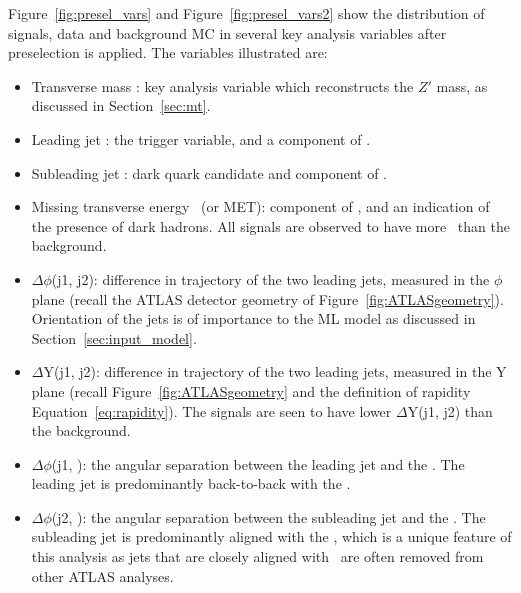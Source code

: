 Figure~\ref{fig:presel_vars} and Figure~\ref{fig:presel_vars2} show the distribution of signals, data and background MC in several key analysis variables after preselection is applied.
The variables illustrated are:
\begin{itemize}
\item Transverse mass \mt: key analysis variable which reconstructs the $Z'$ mass, as discussed in Section~\ref{sec:mt}.
\item Leading jet \pt: the trigger variable, and a component of \mt. 
\item Subleading jet \pt: dark quark candidate and component of \mt.
\item Missing transverse energy \met~(or MET): component of \mt, and an indication of the presence of dark hadrons. All signals are observed to have more \met~than the background.
\item $\Delta\phi$(j1, j2): difference in trajectory of the two leading jets, measured in the $\phi$ plane (recall the ATLAS detector geometry of Figure~\ref{fig:ATLASgeometry}). Orientation of the jets is of importance to the ML model as discussed in Section~\ref{sec:input_model}. 
\item $\Delta$Y(j1, j2): difference in trajectory of the two leading jets, measured in the Y plane (recall Figure~\ref{fig:ATLASgeometry} and the definition of rapidity Equation~\ref{eq:rapidity}). The signals are seen to have lower $\Delta$Y(j1, j2) than the background.
\item $\Delta\phi$(j1, \met): the angular separation between the leading jet and the \met. The leading jet is predominantly back-to-back with the \met.
\item $\Delta\phi$(j2, \met): the angular separation between the subleading jet and the \met. The subleading jet is predominantly aligned with the \met, which is a unique feature of this analysis as jets that are closely aligned with \met~are often removed from other ATLAS analyses.
\end{itemize}

